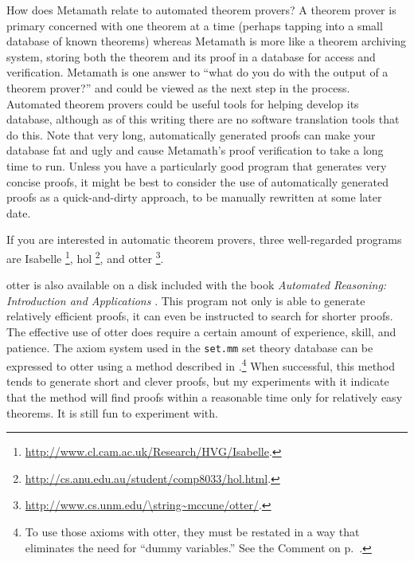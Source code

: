 How does Metamath relate to automated theorem provers?  A
theorem prover is primary concerned with one theorem at a time (perhaps
tapping into a small database of known theorems) whereas Metamath is more like
a theorem archiving system, storing both the theorem and its proof in a
database for access and verification.  Metamath is one answer to ``what do you
do with the output of a theorem prover?''  and could be viewed as the
next step in the process.  Automated theorem provers could be useful tools for
helping develop its database, although as of this writing there are no
software translation tools that do this.  Note that very long, automatically
generated proofs can make your database fat and ugly and cause Metamath's proof
verification to take a long time to run.  Unless you have a particularly good
program that generates very concise proofs, it might be best to consider the
use of automatically generated proofs as a quick-and-dirty approach, to be
manually rewritten at some later date.

If you are interested in automatic theorem provers, three well-regarded
programs are
Isabelle%
\footnote{\url{http://www.cl.cam.ac.uk/Research/HVG/Isabelle}.},
{\sc hol}%
\footnote{\url{http://cs.anu.edu.au/student/comp8033/hol.html}.},
and {\sc otter}%
\footnote{\url{http://www.cs.unm.edu/\string~mccune/otter/}.}.

{\sc otter} is also available on a disk included
with the book {\em Automated Reasoning:  Introduction and Applications}
\cite{Wos}.  This program not only is able to generate
relatively efficient proofs, it can even be instructed to search for
shorter proofs.  The effective use of {\sc otter} does require a certain
amount of experience, skill, and patience.  The axiom system used in the
\texttt{set.mm} set theory
database can be expressed to {\sc otter} using a method described in
\cite{Megill}.\footnote{To use those axioms with
{\sc otter}, they must be restated in a way that eliminates the need for
``dummy variables.'' See the Comment
on p.~\pageref{nodd}.} When successful, this method tends to generate
short and clever proofs, but my experiments with it indicate that the
method will find proofs within a reasonable time only for relatively
easy theorems.  It is still fun to experiment with.

